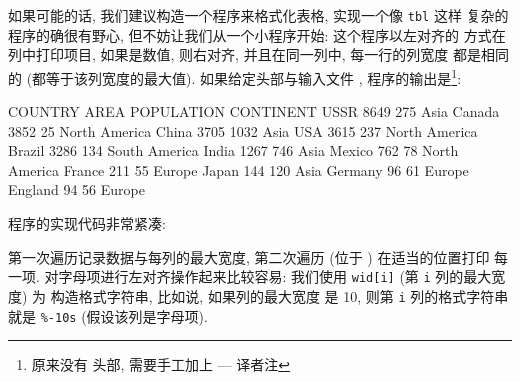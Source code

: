 如果可能的话, 我们建议构造一个程序来格式化表格, 实现一个像 \verb'tbl' 这样 
复杂的程序的确很有野心, 但不妨让我们从一个小程序开始: 这个程序以左对齐的
方式在列中打印项目, 如果是数值, 则右对齐, 并且在同一列中, 每一行的列宽度
都是相同的 (都等于该列宽度的最大值). 如果给定头部与输入文件
, 程序的输出是\footnote{ 原来没有
头部, 需要手工加上 --- 译者注}:
\begin{shell}
    COUNTRY   AREA   POPULATION   CONTINENT    
    USSR      8649       275      Asia         
    Canada    3852        25      North America
    China     3705      1032      Asia         
    USA       3615       237      North America
    Brazil    3286       134      South America
    India     1267       746      Asia         
    Mexico     762        78      North America
    France     211        55      Europe       
    Japan      144       120      Asia         
    Germany     96        61      Europe       
    England     94        56      Europe       
\end{shell}

程序的实现代码非常紧凑:
第一次遍历记录数据与每列的最大宽度, 第二次遍历 (位于 \END) 在适当的位置打印
每一项. 对字母项进行左对齐操作起来比较容易: 我们使用 \verb'wid[i]' (第 
\verb'i' 列的最大宽度) 为 \printf 构造格式字符串, 比如说, 如果列的最大宽度
是 10, 则第 \verb'i' 列的格式字符串就是 \verb'%-10s' (假设该列是字母项).

